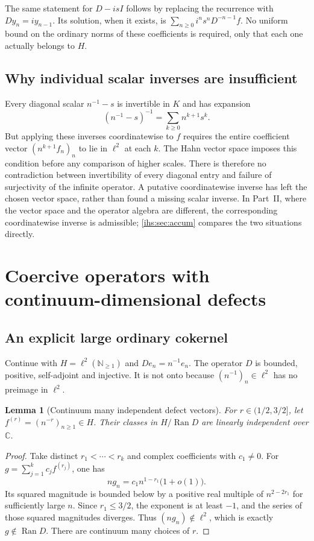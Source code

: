 \documentclass[11pt,a4paper]{article}
\numberwithin{equation}{section}
\newtheorem{lemma}[lemma]{Lemma}
\theoremstyle{definition}
\theoremstyle{remark}
\newcommand{\C}{\mathbb C}
\newcommand{\N}{\mathbb N}
\newcommand{\K}{K}
\newcommand{\Ran}{\operatorname{Ran}}
\begin{document}
The same statement for $D-isI$ follows by replacing the recurrence with
$Dy_n=i y_{n-1}$. Its solution, when it exists, is
$\sum_{n\ge0}i^n s^nD^{-n-1}f$. No uniform bound on the ordinary norms of
these coefficients is required, only that each one actually belongs to $H$.

\subsection{Why individual scalar inverses are insufficient}\label{ihs:hh:sec:scalarinverses}
Every diagonal scalar $n^{-1}-s$ is invertible in $\K$ and has expansion
\[
 (n^{-1}-s)^{-1}=\sum_{k\ge0}n^{k+1}s^k.
\]
But applying these inverses coordinatewise to $f$ requires the entire
coefficient vector $(n^{k+1}f_n)_n$ to lie in $\ell^2$ at each $k$. The Hahn
vector space imposes this condition before any comparison of higher scales.
There is therefore no contradiction between invertibility of every diagonal
entry and failure of surjectivity of the infinite operator. A putative
coordinatewise inverse has left the chosen vector space, rather than found a
missing scalar inverse. In Part~II, where the vector space and
the operator algebra are different, the corresponding coordinatewise inverse
is admissible; \cref{ihs:sec:accum} compares the two situations directly.

\section{Coercive operators with continuum-dimensional defects}\label{ihs:hh:sec:coercive}

\subsection{An explicit large ordinary cokernel}\label{ihs:hh:sec:largecoker}
Continue with $H=\ell^2(\N_{\ge1})$ and $De_n=n^{-1}e_n$. The operator $D$ is
bounded, positive, self-adjoint and injective. It is not onto because
$(n^{-1})_n\in\ell^2$ has no preimage in $\ell^2$.

\begin{lemma}[Continuum many independent defect vectors]\label{ihs:hh:lem:continuum}
For $r\in(1/2,3/2]$, let $f^{(r)}=(n^{-r})_{n\ge1}\in H$. Their classes in
$H/\Ran D$ are linearly independent over $\C$.
\end{lemma}
\begin{proof}
Take distinct $r_1<\cdots<r_k$ and complex coefficients with $c_1\ne0$. For
$g=\sum_{j=1}^k c_j f^{(r_j)}$, one has
\[
 n g_n=c_1 n^{1-r_1}\bigl(1+o(1)\bigr).
\]
Its squared magnitude is bounded below by a positive real multiple of
$n^{2-2r_1}$ for sufficiently large $n$. Since $r_1\le3/2$, the exponent is
at least $-1$, and the series of those squared magnitudes diverges. Thus
$(n g_n)\notin\ell^2$, which is exactly $g\notin\Ran D$. There are continuum
many choices of $r$.
\end{proof}
\end{document}
